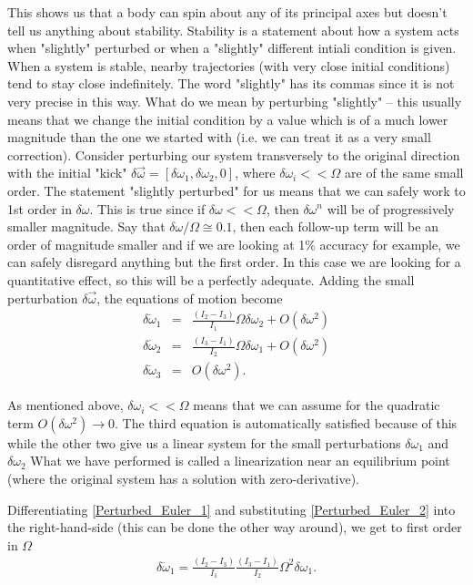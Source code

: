 \documentclass[a4paper]{article}
\begin{document}
	This shows us that a body can spin about any of its principal axes but doesn't tell us anything about stability.
	Stability is a statement about how a system acts when "slightly" perturbed or when a "slightly" different intiali condition is given.
	When a system is stable, nearby trajectories (with very close initial conditions) tend to stay close indefinitely.
	The word "slightly" has its commas since it is not very precise in this way.
	What do we mean by perturbing "slightly" -- this usually means that we change the initial condition by a value which is of a much lower magnitude than the one we started with (i.e. we can treat it as a very small correction).
	Consider perturbing our system transversely to the original direction with the initial "kick" $\delta \vec{\omega} = [ \delta\omega_1 , \delta\omega_2 , 0 ]$, where $\delta\omega_i << \Omega$ are of the same small order.
	The statement "slightly perturbed" for us means that we can safely work to 1st order in $\delta\omega$.
	This is true since if $\delta\omega << \Omega$, then $\delta\omega^n$ will be of progressively smaller magnitude.
	Say that $\delta\omega / \Omega \cong 0.1$, then each follow-up term will be an order of magnitude smaller and if we are looking at 1\% accuracy for example, we can safely disregard anything but the first order.
	In this case we are looking for a quantitative effect, so this will be a perfectly adequate.
	Adding the small perturbation $\delta\vec{\omega}$, the equations of motion become
	\begin{eqnarray}\label{Perturbed_Euler_1}
		\delta\dot{\omega}_1 & = & \frac{( I_2 - I_3 )}{I_1}\Omega \delta\omega_2 + O( \delta\omega^2 ) \\ \label{Perturbed_Euler_2}
		\delta\dot{\omega}_2 & = & \frac{( I_3 - I_1 )}{I_2}\Omega \delta\omega_1 + O( \delta\omega^2 ) \\ \label{Perturbed_Euler_3}
		\delta\dot{\omega}_3 & = & O( \delta\omega^2 ).
	\end{eqnarray}

	As mentioned above, $\delta\omega_i << \Omega$ means that we can assume for the quadratic term $O(\delta\omega^2) \rightarrow 0 $.
	The third equation is automatically satisfied because of this while the other two give us a linear system for the small perturbations $\delta \omega_1$ and $\delta \omega_2$
	What we have performed is called a linearization near an equilibrium point (where the original system has a solution with zero-derivative).

	Differentiating \eqref{Perturbed_Euler_1} and substituting \eqref{Perturbed_Euler_2} into the right-hand-side (this can be done the other way around), we get to first order in $\Omega$
	\begin{eqnarray}
		\delta\ddot{\omega}_1 = \frac{( I_2 - I_3 )}{I_1}\frac{( I_3 - I_1 )}{I_2}\Omega^2 \delta\omega_1.
	\end{eqnarray}
\end{document}
